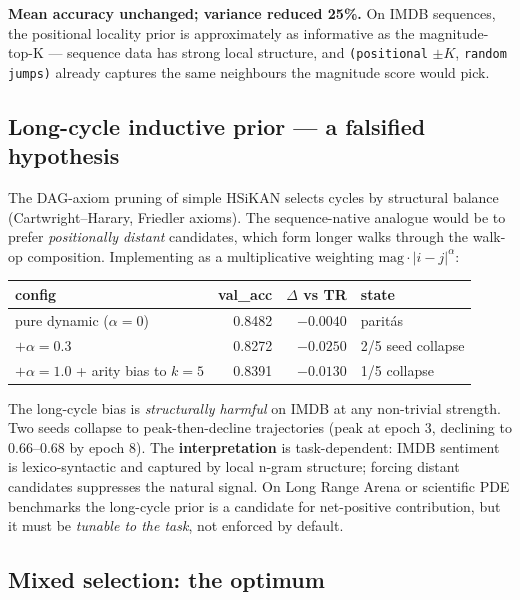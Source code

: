 \documentclass[10pt,a4paper]{article}
\begin{document}
\textbf{Mean accuracy unchanged; variance reduced 25\%.} On IMDB
sequences, the positional locality prior is approximately as
informative as the magnitude-top-K --- sequence data has strong local
structure, and \texttt{(positional} $\pm K$, \texttt{random jumps)}
already captures the same neighbours the magnitude score would pick.

\subsection{Long-cycle inductive prior --- a falsified hypothesis}

The DAG-axiom pruning of simple HSiKAN selects cycles by structural
balance (Cartwright--Harary, Friedler axioms). The sequence-native
analogue would be to prefer \emph{positionally distant} candidates,
which form longer walks through the walk-op composition. Implementing
as a multiplicative weighting $\mathrm{mag} \cdot |i - j|^{\alpha}$:

\begin{center}
\begin{tabular}{lrrl}
\toprule
config & val\_acc & $\Delta$ vs TR & state \\
\midrule
pure dynamic ($\alpha = 0$)             & 0.8482 & $-0.0040$ & paritás \\
$+ \alpha = 0.3$                        & 0.8272 & $-0.0250$ & 2/5 seed collapse \\
$+ \alpha = 1.0$ + arity bias to $k=5$  & 0.8391 & $-0.0130$ & 1/5 collapse \\
\bottomrule
\end{tabular}
\end{center}

The long-cycle bias is \emph{structurally harmful} on IMDB at any
non-trivial strength. Two seeds collapse to peak-then-decline trajectories
(peak at epoch 3, declining to 0.66--0.68 by epoch 8). The
\textbf{interpretation} is task-dependent: IMDB sentiment is
lexico-syntactic and captured by local n-gram structure; forcing
distant candidates suppresses the natural signal. On Long Range Arena
or scientific PDE benchmarks the long-cycle prior is a candidate for
net-positive contribution, but it must be \emph{tunable to the task},
not enforced by default.

\subsection{Mixed selection: the optimum}
\end{document}
